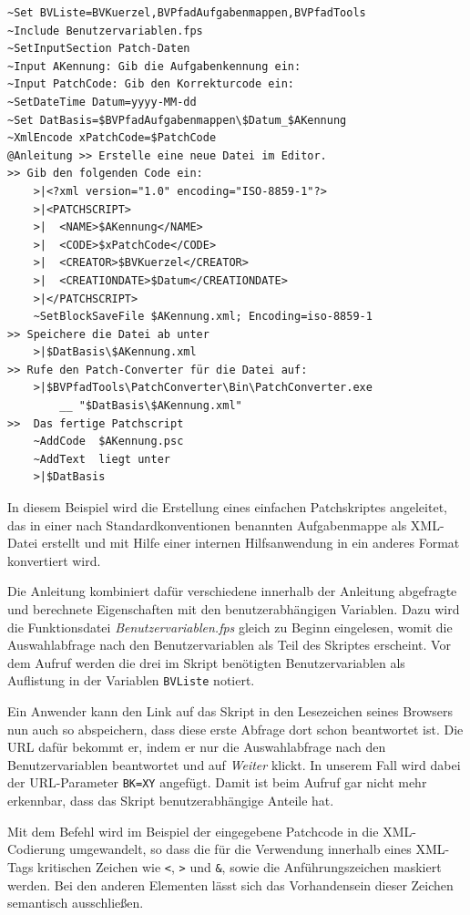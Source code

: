 \label{BspPatchskript}
\begin{verbatim}
~Set BVListe=BVKuerzel,BVPfadAufgabenmappen,BVPfadTools
~Include Benutzervariablen.fps
~SetInputSection Patch-Daten
~Input AKennung: Gib die Aufgabenkennung ein:
~Input PatchCode: Gib den Korrekturcode ein:
~SetDateTime Datum=yyyy-MM-dd
~Set DatBasis=$BVPfadAufgabenmappen\$Datum_$AKennung
~XmlEncode xPatchCode=$PatchCode
@Anleitung >> Erstelle eine neue Datei im Editor.
>> Gib den folgenden Code ein:
    >|<?xml version="1.0" encoding="ISO-8859-1"?>
    >|<PATCHSCRIPT>
    >|  <NAME>$AKennung</NAME>
    >|  <CODE>$xPatchCode</CODE>
    >|  <CREATOR>$BVKuerzel</CREATOR>
    >|  <CREATIONDATE>$Datum</CREATIONDATE>
    >|</PATCHSCRIPT>
    ~SetBlockSaveFile $AKennung.xml; Encoding=iso-8859-1
>> Speichere die Datei ab unter
    >|$DatBasis\$AKennung.xml
>> Rufe den Patch-Converter für die Datei auf:
    >|$BVPfadTools\PatchConverter\Bin\PatchConverter.exe
        __ "$DatBasis\$AKennung.xml"
>>  Das fertige Patchscript
    ~AddCode  $AKennung.psc
    ~AddText  liegt unter
    >|$DatBasis
\end{verbatim}

In diesem Beispiel wird die Erstellung eines einfachen Patchskriptes angeleitet, das in einer nach Standardkonventionen benannten Aufgabenmappe als XML-Datei erstellt und mit Hilfe einer internen Hilfsanwendung in ein anderes Format konvertiert wird.

Die Anleitung kombiniert dafür verschiedene innerhalb der Anleitung abgefragte und berechnete Eigenschaften mit den benutzerabhängigen Variablen. Dazu wird die Funktionsdatei \emph{Benutzervariablen.fps} gleich zu Beginn eingelesen, womit die Auswahlabfrage nach den Benutzervariablen als Teil des Skriptes erscheint.
Vor dem Aufruf werden die drei im Skript benötigten Benutzervariablen als Auflistung in der Variablen \verb|BVListe| notiert.

Ein Anwender kann den Link auf das Skript in den Lesezeichen seines Browsers nun auch so abspeichern, dass diese erste Abfrage dort schon beantwortet ist. Die URL dafür bekommt er, indem er nur die Auswahlabfrage nach den Benutzervariablen beantwortet und auf \emph{Weiter} klickt. In unserem Fall wird dabei der URL-Parameter \verb|BK=XY| angefügt. Damit ist beim Aufruf gar nicht mehr erkennbar, dass das Skript benutzerabhängige Anteile hat.

Mit dem Befehl  wird im Beispiel der eingegebene Patchcode in die XML-Codierung umgewandelt, so dass die für die Verwendung innerhalb eines XML-Tags kritischen Zeichen wie \verb|<|, \verb|>| und \verb|&|, sowie die Anführungszeichen maskiert werden. Bei den anderen Elementen lässt sich das Vorhandensein dieser Zeichen semantisch ausschließen.

